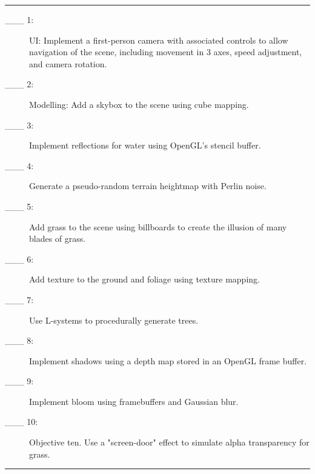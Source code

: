 \documentclass{article}
\begin{document}
\hrule
\begin{description}
        \item[\_\_\_ 1:]
          UI: Implement a first-person camera with associated controls to allow navigation of the scene, including movement in 3 axes, speed adjustment, and camera rotation.

        \item[\_\_\_ 2:]
		  Modelling: Add a skybox to the scene using cube mapping.

        \item[\_\_\_ 3:]
		  Implement reflections for water using OpenGL's stencil buffer.
			
        \item[\_\_\_ 4:]
		  Generate a pseudo-random terrain heightmap with Perlin noise.

        \item[\_\_\_ 5:]
		  Add grass to the scene using billboards to create the illusion of many blades of grass.

        \item[\_\_\_ 6:]
	      Add texture to the ground and foliage using texture mapping.

        \item[\_\_\_ 7:]
		  Use L-systems to procedurally generate trees.

        \item[\_\_\_ 8:]
		  Implement shadows using a depth map stored in an OpenGL frame buffer.

        \item[\_\_\_ 9:]
		  Implement bloom using framebuffers and Gaussian blur.

        \item[\_\_\_ 10:]
		  Objective ten. Use a "screen-door" effect to simulate alpha transparency for grass.

\end{description}

\hrule
\end{document}
